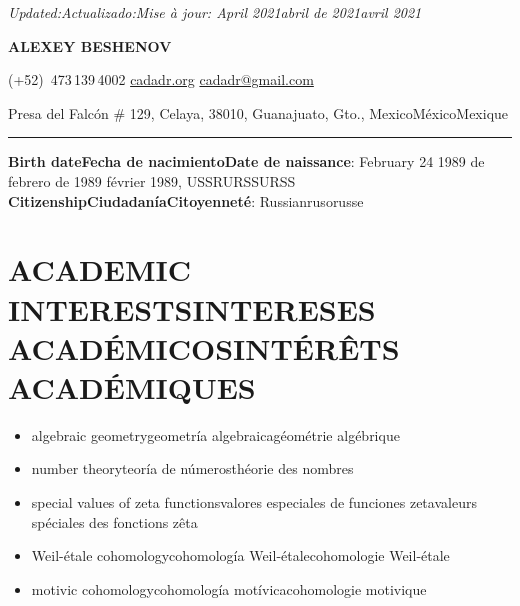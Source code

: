 \documentclass{article}
\newcommand{\biling}[3]{\ifdefined\english#1\fi\ifdefined\spanish#2\fi\ifdefined\french#3\fi}
\begin{document}
{\flushright\noindent\emph{\biling{Updated:}{Actualizado:}{Mise à jour:} \biling{April 2021}{abril de 2021}{avril 2021}}

}

\begin{center}
{\LARGE\sffamily\bf ALEXEY BESHENOV}

\vspace{0.5em}

\faPhoneSquare{} (+52)~473\,139\,4002 \quad
\faGlobe{} \href{https://cadadr.org/}{cadadr.org} \quad
\faEnvelope{} \href{mailto:cadadr@gmail.com}{cadadr@gmail.com} \\

\vspace{0.5em}

Presa del Falcón \# 129, Celaya, 38010, Guanajuato, Gto., \biling{Mexico}{México}{Mexique}

\vspace{1em}

\rule{14cm}{1pt}

\end{center}

\vspace{1em}


\noindent \textbf{\biling{Birth date}{Fecha de nacimiento}{Date de naissance}}: \biling{February 24 1989}{24 de febrero de 1989}{24 février 1989}, \biling{USSR}{URSS}{URSS} \\
\textbf{\biling{Citizenship}{Ciudadanía}{Citoyenneté}}: \biling{Russian}{ruso}{russe}

{\color{RoyalBlue}\section*{\biling{ACADEMIC INTERESTS}{INTERESES ACADÉMICOS}{INTÉRÊTS ACADÉMIQUES}}}

\begin{itemize}
\item\biling{algebraic geometry}{geometría algebraica}{géométrie algébrique}
\item \biling{number theory}{teoría de números}{théorie des nombres}
\item \biling{special values of zeta functions}{valores especiales de funciones zeta}{valeurs spéciales des fonctions zêta}
\item \biling{Weil-étale cohomology}{cohomología Weil-étale}{cohomologie Weil-étale}
\item \biling{motivic cohomology}{cohomología motívica}{cohomologie motivique}
\end{itemize}
  
\end{document}
